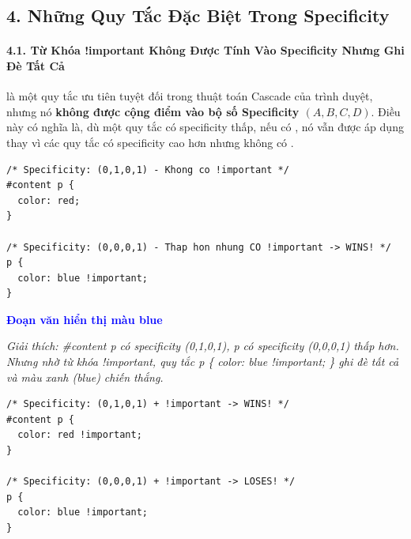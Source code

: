 \subsection{4. Những Quy Tắc Đặc Biệt Trong Specificity}

\paragraph{4.1. Từ Khóa !important Không Được Tính Vào Specificity Nhưng Ghi Đè Tất Cả}

\begin{conceptBox}
 là một quy tắc ưu tiên tuyệt đối trong thuật toán Cascade của trình duyệt, nhưng nó \textbf{không được cộng điểm vào bộ số Specificity $(A,B,C,D)$}. Điều này có nghĩa là, dù một quy tắc có specificity thấp, nếu có , nó vẫn được áp dụng thay vì các quy tắc có specificity cao hơn nhưng không có .
\end{conceptBox}

\begin{codeWindow}
\begin{lstlisting}[language=CSS3]
/* Specificity: (0,1,0,1) - Khong co !important */
#content p {
  color: red;
}

/* Specificity: (0,0,0,1) - Thap hon nhung CO !important -> WINS! */
p {
  color: blue !important;
}
\end{lstlisting}
\end{codeWindow}

\begin{browserWindow}
\sffamily\small
\textcolor{blue}{\textbf{Đoạn văn hiển thị màu blue}} \par\vspace{4pt}
{\scriptsize\textcolor{gray!60}{\textit{Giải thích: \#content p có specificity (0,1,0,1), p có specificity (0,0,0,1) thấp hơn. Nhưng nhờ từ khóa !important, quy tắc p \{ color: blue !important; \} ghi đè tất cả và màu xanh (blue) chiến thắng.}}}
\end{browserWindow}

\begin{codeWindow}
\begin{lstlisting}[language=CSS3]
/* Specificity: (0,1,0,1) + !important -> WINS! */
#content p {
  color: red !important;
}

/* Specificity: (0,0,0,1) + !important -> LOSES! */
p {
  color: blue !important;
}
\end{lstlisting}
\end{codeWindow}

